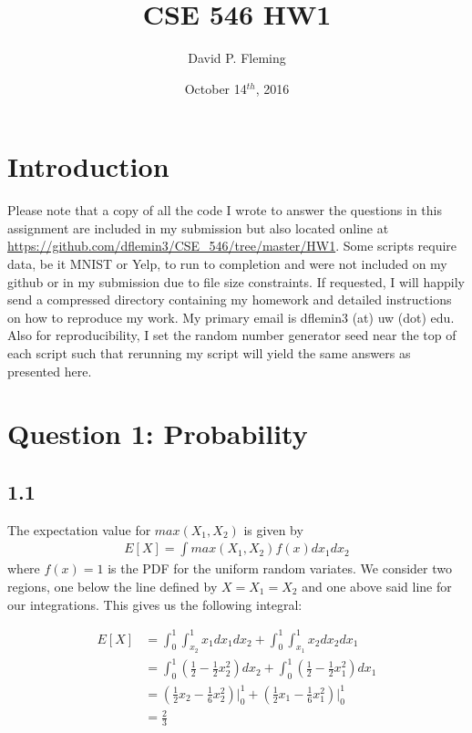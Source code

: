 \documentclass[12pt]{amsart}
\title{CSE 546 HW1}
\author{David P. Fleming}
\date{October 14$^{th}$, 2016}
\begin{document}
\maketitle
\tableofcontents

\section*{Introduction}

Please note that a copy of all the code I wrote to answer the questions in this assignment are included in my submission but also located online at \url{https://github.com/dflemin3/CSE_546/tree/master/HW1}.  Some scripts require data, be it MNIST or Yelp, to run to completion and were not included on my github or in my submission due to file size constraints.  If requested, I will happily send a compressed directory containing my homework and detailed instructions on how to reproduce my work.  My primary email is dflemin3 (at) uw (dot) edu.  Also for reproducibility, I set the random number generator seed near the top of each script such that rerunning my script will yield the same answers as presented here.


\section*{Question 1: Probability}

\subsection*{1.1}
The expectation value for $max(X_1, X_2)$ is given by
\begin{align}
E[X] = \int max(X_1,X_2) f(x) dx_1 dx_2
\end{align}
where $f(x) = 1$ is the PDF for the uniform random variates.  We consider two regions, one below the line defined by $X = X_1 = X_2$ and one above said line for our integrations.  This gives us the following integral:

\begin{equation} \label{eqn:1.1}
\begin{split}
E[X] & = \int_0^1 \int_{x_2}^1 x_1 dx_1 dx_2 + \int_0^1 \int_{x_1}^1 x_2 dx_2 dx_1 \\
& = \int_0^1 (\frac{1}{2} - \frac{1}{2}x_2^2) dx_2 + \int_0^1 (\frac{1}{2} - \frac{1}{2}x_1^2) dx_1 \\
& = (\frac{1}{2}x_2 - \frac{1}{6}x_2^2) \vert_0^1 + (\frac{1}{2}x_1 - \frac{1}{6}x_1^2) \vert_0^1 \\
& = \frac{2}{3}
\end{split}
\end{equation}
\end{document}
